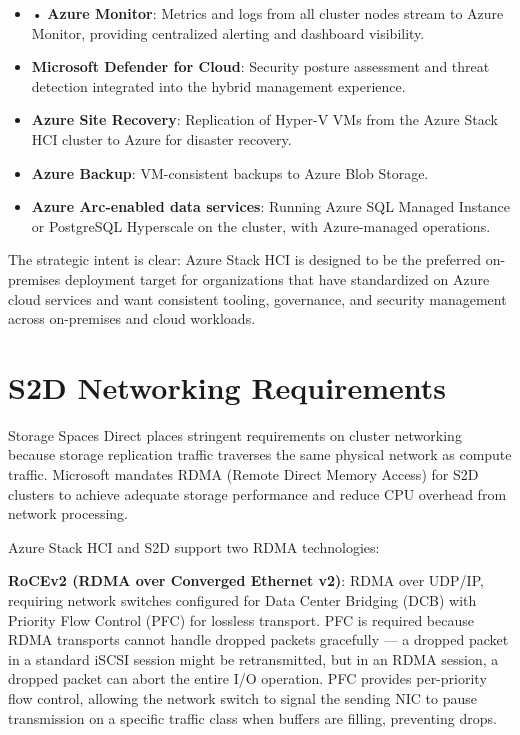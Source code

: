 \begin{itemize}
  \item • \textbf{Azure Monitor}: Metrics and logs from all cluster nodes stream to Azure Monitor, providing centralized alerting and dashboard visibility.
  \item \textbf{Microsoft Defender for Cloud}: Security posture assessment and threat detection integrated into the hybrid management experience.
  \item \textbf{Azure Site Recovery}: Replication of Hyper-V VMs from the Azure Stack HCI cluster to Azure for disaster recovery.
  \item \textbf{Azure Backup}: VM-consistent backups to Azure Blob Storage.
  \item \textbf{Azure Arc-enabled data services}: Running Azure SQL Managed Instance or PostgreSQL Hyperscale on the cluster, with Azure-managed operations.
\end{itemize}

The strategic intent is clear: Azure Stack HCI is designed to be the preferred on-premises deployment target for organizations that have standardized on Azure cloud services and want consistent tooling, governance, and security management across on-premises and cloud workloads.

\section{S2D Networking Requirements}
Storage Spaces Direct places stringent requirements on cluster networking because storage replication traffic traverses the same physical network as compute traffic. Microsoft mandates RDMA (Remote Direct Memory Access) for S2D clusters to achieve adequate storage performance and reduce CPU overhead from network processing.

Azure Stack HCI and S2D support two RDMA technologies:

\textbf{RoCEv2 (RDMA over Converged Ethernet v2)}: RDMA over UDP/IP, requiring network switches configured for Data Center Bridging (DCB) with Priority Flow Control (PFC) for lossless transport. PFC is required because RDMA transports cannot handle dropped packets gracefully --- a dropped packet in a standard iSCSI session might be retransmitted, but in an RDMA session, a dropped packet can abort the entire I/O operation. PFC provides per-priority flow control, allowing the network switch to signal the sending NIC to pause transmission on a specific traffic class when buffers are filling, preventing drops.


